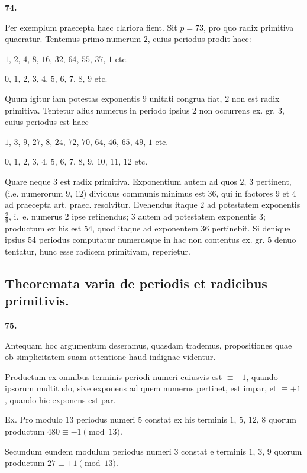 \documentclass[12pt,a4paper]{article}
\theoremstyle{plain}
\theoremstyle{definition}
\theoremstyle{remark}
\begin{document}
\setcounter{satz}{74}
\addtocounter{satz}{-1}
\textbf{74.}

Per exemplum praecepta haec clariora fient. Sit $p=73$, pro quo radix primitiva quaeratur. Tentemus primo numerum $2$, cuius periodus prodit haec:

$1$, $2$, $4$, $8$, $16$, $32$, $64$, $55$, $37$, $1$ etc.

$0$, $1$, $2$, $3$, $4$, $5$, $6$, $7$, $8$, $9$ etc.

Quum igitur iam potestas exponentis $9$ unitati congrua fiat, $2$ non est radix primitiva. Tentetur alius numerus in periodo ipsius $2$ non occurrens ex. gr. $3$, cuius periodus est haec

$1$, $3$, $9$, $27$, $8$, $24$, $72$, $70$, $64$, $46$, $65$, $49$, $1$ etc.

$0$, $1$, $2$, $3$, $4$, $5$, $6$, $7$, $8$, $9$, $10$, $11$, $12$ etc.

Quare neque $3$ est radix primitiva. Exponentium autem ad quos $2$, $3$ pertinent, (i.e. numerorum $9$, $12$) dividuus communis minimus est $36$, qui in factores $9$ et $4$ ad praecepta art. praec. resolvitur. Evehendus itaque $2$ ad potestatem exponentis $\frac{9}{9}$, i.~e. numerus $2$ ipse retinendus; $3$ autem ad potestatem exponentis $3$; productum ex his est $54$, quod itaque ad exponentem $36$ pertinebit. Si denique ipsius $54$ periodus computatur numerusque in hac non contentus ex. gr. $5$ denuo tentatur, hunc esse radicem primitivam, reperietur.

\subsection*{Theoremata varia de periodis et radicibus primitivis.}

\setcounter{satz}{75}
\addtocounter{satz}{-1}
\textbf{75.}

Antequam hoc argumentum deseramus, quasdam trademus, propositiones quae ob simplicitatem suam attentione haud indignae videntur.

Productum ex omnibus terminis periodi numeri cuiusvis est $\equiv -1$, quando ipsorum multitudo, sive exponens ad quem numerus pertinet, est impar, et $\equiv +1$, quando hic exponens est par.

\textsc{Ex.} Pro modulo $13$ periodus numeri $5$ constat ex his terminis $1$, $5$, $12$, $8$ quorum productum $480 \equiv -1 \pmod{13}$.

Secundum eundem modulum periodus numeri $3$ constat e terminis $1$, $3$, $9$ quorum productum $27 \equiv +1 \pmod{13}$.
\end{document}
